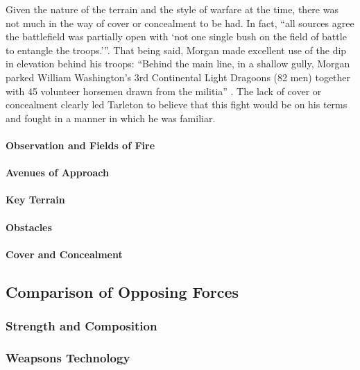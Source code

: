 Given the nature of the terrain and the style of warfare at the time, there was
not much in the way of cover or concealment to be had.  In fact, ``all sources
agree the battlefield was partially open with `not one single bush on the field
of battle to entangle the troops.'''\cite[66]{babits_devil_2001}. That being
said, Morgan made excellent use of the dip in elevation behind his troops:
``Behind the main line, in a shallow gully, Morgan parked William Washington's
3rd Continental Light Dragoons (82 men) together with 45 volunteer horsemen
drawn from the militia'' \cite[327]{stephenson_patriot_2007}.  The lack of
cover or concealment clearly led Tarleton to believe that this fight would be
on his terms and fought in a manner in which he was familiar.  


\paragraph{Observation and Fields of Fire}

\paragraph{Avenues of Approach}

\paragraph{Key Terrain}

\paragraph{Obstacles}

\paragraph{Cover and Concealment}

\subsection{Comparison of Opposing Forces}


\subsubsection{Strength and Composition}

\subsubsection{Weapsons Technology}

